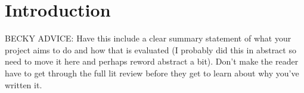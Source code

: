 \chapter*{Introduction}

BECKY ADVICE: Have this include a clear summary statement of what your project aims to do and how that is evaluated (I probably did this in abstract so need to move it here and perhaps reword abstract a bit). Don't make the reader have to get through the full lit review before they get to learn about why you've written it.